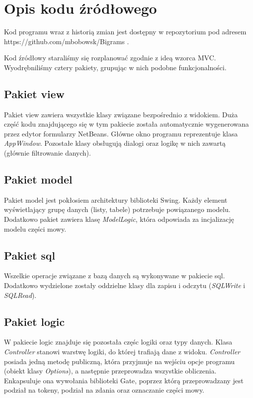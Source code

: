 \documentclass[11pt]{article}
\begin{document}
\section{Opis kodu źródłowego}
Kod programu wraz z historią zmian jest dostępny w repozytorium pod adresem https://github.com/mbobowsk/Bigrams .

Kod źródłowy staraliśmy się rozplanować zgodnie z ideą wzorca MVC.
Wyodrębniliśmy cztery pakiety, grupując w nich podobne funkcjonalności.
\subsection{Pakiet view}
Pakiet view zawiera wszystkie klasy związane bezpośrednio z widokiem.
Duża część kodu znajdującego się w tym pakiecie została automatycznie wygenerowana przez edytor formularzy NetBeans.
Główne okno programu reprezentuje klasa \emph{AppWindow}.
Pozostałe klasy obsługują dialogi oraz logikę w nich zawartą (głównie filtrowanie danych).

\subsection{Pakiet model}
Pakiet model jest pokłosiem architektury biblioteki Swing.
Każdy element wyświetlający grupę danych (listy, tabele) potrzebuje powiązanego modelu.
Dodatkowo pakiet zawiera klasę \emph{ModelLogic}, która odpowiada za incjalizację modelu części mowy.

\subsection{Pakiet sql}
Wszelkie operacje związane z bazą danych są wykonywane w pakiecie sql.
Dodatkowo wydzielone zostały oddzielne klasy dla zapisu i odczytu (\emph{SQLWrite} i \emph{SQLRead}).

\subsection{Pakiet logic}
W pakiecie logic znajduje się pozostała częśc logiki oraz typy danych.
Klasa \emph{Controller} stanowi warstwę logiki, do której trafiają dane z widoku.
\emph{Controller} posiada jedną metodę publiczną, która przyjmuje na wejściu opcje programu (obiekt klasy \emph{Options}), a następnie przeprowadza wszystkie obliczenia.
Enkapsuluje ona wywołania biblioteki Gate, poprzez którą przeprowadzany jest podział na tokeny, podział na zdania oraz oznaczanie części mowy.
\end{document}
